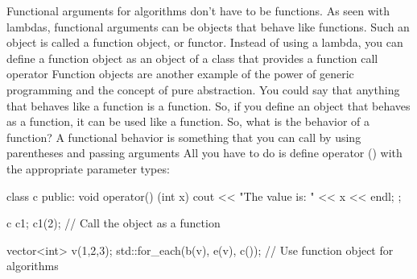 \documentclass{report}
\begin{document}
   \pagebreak 
   \bigbreak \noindent 
   Functional arguments for algorithms don’t have to be functions. As seen with lambdas, functional arguments can be objects that behave like functions. Such an object is called a function object, or functor. Instead of using a lambda, you can define a function object as an object of a class that provides a function call operator
   \bigbreak \noindent 
   Function objects are another example of the power of generic programming and the concept of pure
   abstraction. You could say that anything that behaves like a function is a function. So, if you define
   an object that behaves as a function, it can be used like a function.
   \bigbreak \noindent 
   So, what is the behavior of a function? A functional behavior is something that you can call by
   using parentheses and passing arguments
   \bigbreak \noindent 
   All you have to do is define operator () with the appropriate parameter types:
   \bigbreak \noindent 
   \begin{cppcode}
       class c {
           public:
           void operator() (int x) {
               cout << "The value is: " << x << endl;
           }
       };

       c c1;
       c1(2); // Call the object as a function

       vector<int> v({1,2,3});
       std::for_each(b(v), e(v), c()); // Use function object for algorithms
   \end{cppcode}

   \bigbreak \noindent 
\end{document}
